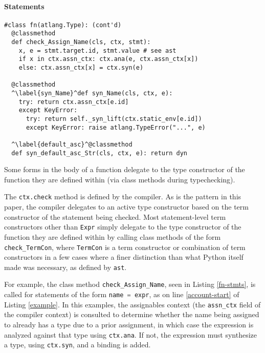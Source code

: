 \documentclass[9pt,preprint]{sigplanconf}
\newcommand{\lstinlinep}[1]{\lstinline[language=Python,basicstyle=\ttfamily\small]{#1}}
\begin{document}

\paragraph{Statements}
\begin{codelisting}[t]
\begin{lstlisting}
#class fn(atlang.Type): (cont'd) 
  @classmethod
  def check_Assign_Name(cls, ctx, stmt):
    x, e = stmt.target.id, stmt.value # see ast
    if x in ctx.assn_ctx: ctx.ana(e, ctx.assn_ctx[x])
    else: ctx.assn_ctx[x] = ctx.syn(e)
    
  @classmethod
  ^\label{syn_Name}^def syn_Name(cls, ctx, e):
    try: return ctx.assn_ctx[e.id]
    except KeyError:
      try: return self._syn_lift(ctx.static_env[e.id])
      except KeyError: raise atlang.TypeError("...", e)
  
  ^\label{default_asc}^@classmethod
  def syn_default_asc_Str(cls, ctx, e): return dyn
\end{lstlisting}
\caption{Some forms in the body of a function delegate to the type constructor of the function they are defined within (via class methods during typechecking).}
\label{fn-stmts}
\end{codelisting}
The \lstinlinep{ctx.check} method is defined by the compiler. As is the pattern in this paper, the compiler delegates to an active type constructor based on the term constructor of the statement being checked. Most statement-level term constructors other than \lstinlinep{Expr} simply delegate to the type constructor of the function they are defined within by calling class methods of the form \lstinlinep{check_TermCon}, where \lstinlinep{TermCon} is a term constructor or combination of term constructors in a few cases where a finer distinction than what Python itself made was necessary, as defined by \lstinlinep{ast}.

For example, the class method \lstinlinep{check_Assign_Name}, seen in Listing \ref{fn-stmts}, is called for statements of the form \lstinlinep{name = expr}, as on line \ref{account-start} of Listing \ref{example}. In this examples, the assignables context (the \lstinlinep{assn_ctx} field of the compiler context) is consulted to determine whether the name being assigned to already has a type due to a prior assignment, in which case the expression is analyzed against that type using \lstinlinep{ctx.ana}. If not, the expression must synthesize a type, using \lstinlinep{ctx.syn}, and a binding is added. %
\end{document}
